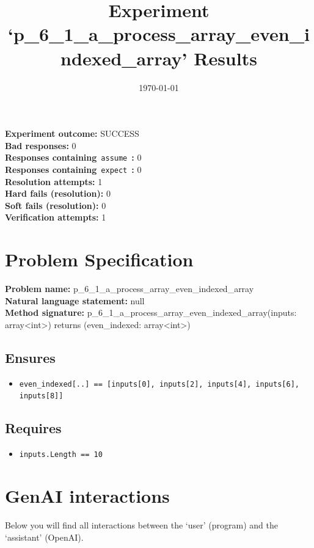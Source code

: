 \documentclass{article}
\begin{document}
\title{Experiment `p\_6\_1\_a\_process\_array\_even\_indexed\_array' Results}
\author{\today}
\date{}
\maketitle
\textbf{Experiment outcome: }SUCCESS
\\\textbf{Bad responses: }0
\\\textbf{Responses containing}~\texttt{assume}~\textbf{: }0
\\\textbf{Responses containing}~\texttt{expect}~\textbf{: }0
\\\textbf{Resolution attempts: }1
\\\textbf{Hard fails (resolution): }0
\\\textbf{Soft fails (resolution): }0
\\\textbf{Verification attempts: }1
\section*{Problem Specification}
\textbf{Problem name: }p\_6\_1\_a\_process\_array\_even\_indexed\_array
\\\textbf{Natural language statement: }null
\\\textbf{Method signature: }p\_6\_1\_a\_process\_array\_even\_indexed\_array(inputs: array<int>) returns (even\_indexed: array<int>)
\subsection*{Ensures}
\begin{itemize}
\item \texttt{even\_indexed[..] == [inputs[0], inputs[2], inputs[4], inputs[6], inputs[8]]}
\end{itemize}
\subsection*{Requires}
\begin{itemize}
\item \texttt{inputs.Length == 10}
\end{itemize}
\clearpage
\section*{GenAI interactions}
Below you will find all interactions between the `user' (program) and the `assistant' (OpenAI).
\end{document}
